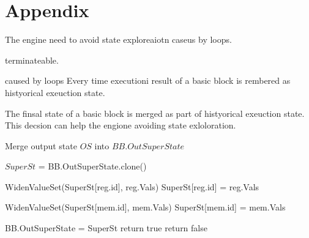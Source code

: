 \section*{Appendix}

The engine need to avoid state exploreaiotn caseus by loops.

terminateable.

caused by loops
Every time executioni result of a basic block is rembered as histyorical exeuction state.

The finsal state of a basic block is merged as part of histyorical exeuction state.
This decsion can help the engione avoiding state exloloration.

\begin{algorithm}
    \caption{Merge output state $OS$ into $BB.OutSuperState$ }
    \footnotesize
    \begin{algorithmic}[1]
        \State $SuperSt$ = BB.OutSuperState.clone()

        \State
         
        \State WidenValueSet(SuperSt[reg.id], reg.Vals)
        \Else
        \State SuperSt[reg.id] = reg.Vals
        \EndIf
        \EndFor

        \State
         
        \State WidenValueSet(SuperSt[mem.id], mem.Vals)
        \Else
        \State SuperSt[mem.id] = mem.Vals
        \EndIf
        \EndFor

        \State
         
        \State BB.OutSuperState = SuperSt 
        \State return true 
        \EndIf
        \State return false 
        \EndFunction
    \end{algorithmic}
\end{algorithm}


